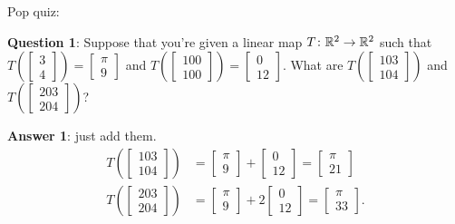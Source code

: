 Pop quiz:
\begin{itemize}
	\ii \textbf{Question 1}:
	Suppose that you're given a linear map $T \colon \mathbb R^2 \to \mathbb R^2$ such that
	$T\left( \left[ \begin{smallmatrix} 3 \\ 4 \end{smallmatrix} \right] \right)
	= \left[ \begin{smallmatrix} \pi \\ 9 \end{smallmatrix} \right]$
	and
	$T\left( \left[ \begin{smallmatrix} 100 \\ 100 \end{smallmatrix} \right] \right)
	= \left[ \begin{smallmatrix} 0 \\ 12 \end{smallmatrix} \right]$.
	What are
	$T\left( \left[ \begin{smallmatrix} 103 \\ 104 \end{smallmatrix} \right] \right)$ and
	$T\left( \left[ \begin{smallmatrix} 203 \\ 204 \end{smallmatrix} \right] \right)$?

	\textbf{Answer 1}: just add them.
	\begin{align*}
		T\left( \begin{bmatrix} 103 \\ 104  \end{bmatrix} \right)
		&= \begin{bmatrix} \pi \\ 9 \end{bmatrix}
		+ \begin{bmatrix} 0 \\ 12 \end{bmatrix}
		= \begin{bmatrix} \pi \\ 21 \end{bmatrix} \\
		T\left( \begin{bmatrix} 203 \\ 204  \end{bmatrix} \right)
		&= \begin{bmatrix} \pi \\ 9 \end{bmatrix}
		+ 2\begin{bmatrix} 0 \\ 12 \end{bmatrix}
		= \begin{bmatrix} \pi \\ 33 \end{bmatrix}.
	\end{align*}


\end{itemize}
